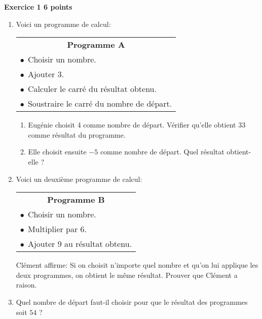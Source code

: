 \textbf{Exercice 1 \hfill 6 points}

\medskip

\begin{enumerate}
\item Voici un programme de calcul:

\begin{center}
\begin{tabular}{|l|}\hline
\multicolumn{1}{|c|}{\textbf{Programme A}}\\
$\bullet~~$Choisir un nombre.\\
$\bullet~~$Ajouter 3.\\
$\bullet~~$Calculer le carré du résultat obtenu.\\
$\bullet~~$Soustraire le carré du nombre de départ.\\ \hline
\end{tabular}
\end{center}

	\begin{enumerate}
		\item Eugénie choisit 4 comme nombre de départ. Vérifier qu'elle obtient 33 comme résultat du programme.
		\item Elle choisit ensuite $- 5$ comme nombre de départ. Quel résultat obtient-elle ?
	\end{enumerate}
\item Voici un deuxième programme de calcul:

\begin{center}
\begin{tabular}{|l|}\hline
\multicolumn{1}{|c|}{\textbf{Programme B}}\\
$\bullet~~$Choisir un nombre.\\
$\bullet~~$Multiplier par 6.\\
$\bullet~~$Ajouter 9 au résultat obtenu.\\ \hline
\end{tabular}
\end{center}

Clément affirme: \og Si on choisit n'importe quel nombre et qu'on lui applique les deux programmes, on
obtient le même résultat. \fg
Prouver que Clément a raison.
\item Quel nombre de départ faut-il choisir pour que le résultat des programmes soit $54$ ?
\end{enumerate}
 
\vspace{0,5cm}

